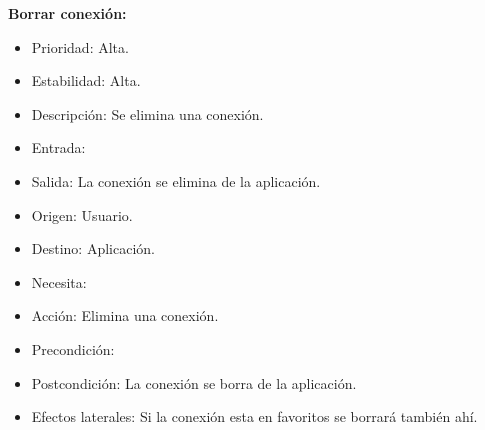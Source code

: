 \textbf{Borrar conexión:}
\begin{itemize}
\item Prioridad: Alta.
\item Estabilidad: Alta.
\item Descripción: Se elimina una conexión.
\item Entrada:
\item Salida: La conexión se elimina de la aplicación.
\item Origen: Usuario.
\item Destino: Aplicación.
\item Necesita:
\item Acción: Elimina una conexión.
\item Precondición:
\item Postcondición: La conexión se borra de la aplicación.
\item Efectos laterales: Si la conexión esta en favoritos se borrará también ahí.\\

\end{itemize}

